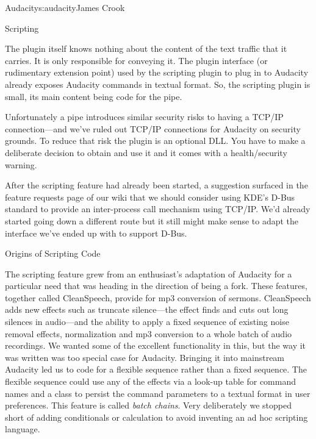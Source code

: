 \begin{aosachapter}{Audacity}{s:audacity}{James Crook}
\begin{aosasect1}{Scripting}

The plugin itself knows nothing about the content of the text traffic
that it carries. It is only responsible for conveying it. The plugin
interface (or rudimentary extension point) used by the scripting
plugin to plug in to Audacity already exposes Audacity commands in
textual format.  So, the scripting plugin is small, its main content
being code for the pipe.

Unfortunately a pipe introduces similar security risks to having a
TCP/IP connection---and we've ruled out TCP/IP connections for
Audacity on security grounds.  To reduce that risk the plugin is an
optional DLL\@.  You have to make a deliberate decision to obtain and
use it and it comes with a health/security warning.

After the scripting feature had already been started, a suggestion
surfaced in the feature requests page of our wiki that we should
consider using KDE's D-Bus standard to provide an inter-process call
mechanism using TCP/IP\@.  We'd already started going down a different
route but it still might make sense to adapt the interface we've ended
up with to support D-Bus.

\begin{aosabox}{Origins of Scripting Code}

The scripting feature grew from an enthusiast's adaptation of Audacity
for a particular need that was heading in the direction of being a
fork.  These features, together called CleanSpeech, provide for mp3
conversion of sermons.  CleanSpeech adds new effects such as truncate
silence---the effect finds and cuts out long silences in audio---and
the ability to apply a fixed sequence of existing noise removal
effects, normalization and mp3 conversion to a whole batch of audio
recordings.  We wanted some of the excellent functionality in this,
but the way it was written was too special case for Audacity.
Bringing it into mainstream Audacity led us to code for a flexible
sequence rather than a fixed sequence.  The flexible sequence could
use any of the effects via a look-up table for command names and a
 class to persist the command parameters to a textual
format in user preferences.  This feature is called \emph{batch
chains}.  Very deliberately we stopped short of adding conditionals
or calculation to avoid inventing an ad hoc scripting language.


\end{aosabox}
\end{aosasect1}
\end{aosachapter}
